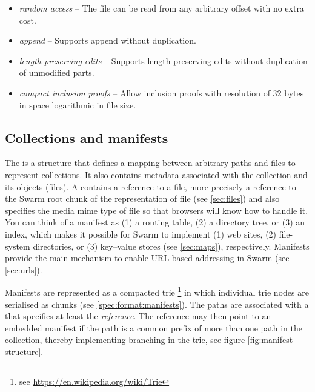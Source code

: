 \begin{itemize}
    \item \emph{random access} -- The file can be read from any arbitrary offset with no extra cost.
    \item \emph{append} -- Supports append without duplication. 
    \item \emph{length preserving edits} -- Supports length preserving edits without duplication of unmodified parts.
    \item \emph{compact inclusion proofs} -- Allow inclusion proofs with resolution of 32 bytes in space logarithmic in file size.
\end{itemize}



\subsection{Collections and manifests\statusgreen}\label{sec:collections}

The  is a structure that defines a mapping between arbitrary paths and files to represent collections. It also contains metadata associated with the collection and its objects (files). A  contains a reference to a file, more precisely a reference to the Swarm root chunk of the representation of file (see \ref{sec:files}) and also specifies the media mime type of file so that browsers will know how to handle it. You can think of a manifest as (1) a routing table, (2) a directory tree, or  (3) an index, which makes it possible for Swarm to implement (1) web sites, (2) file-system directories, or (3) key--value stores (see \ref{sec:maps}), respectively. Manifests provide the main mechanism to enable URL based addressing in Swarm (see \ref{sec:urls}). 

Manifests are represented as a compacted trie%
%
\footnote{see \url{https://en.wikipedia.org/wiki/Trie}}
%
in which individual trie nodes are serialised as chunks (see \ref{spec:format:manifests}). The paths are associated with a  that specifies at least the \emph{reference}. The reference may then point to an embedded manifest if the path is a common prefix of more than one path in the collection, thereby implementing branching in the trie, see figure \ref{fig:manifest-structure}. 


